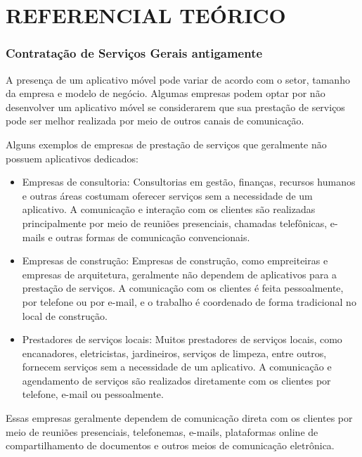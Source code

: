 \chapter{REFERENCIAL TEÓRICO}\label{cap:desenvolvimento}
\subsection{Contratação de Serviços Gerais antigamente}
A presença de um aplicativo móvel pode variar de acordo com o setor, tamanho da empresa e modelo de negócio. 
Algumas empresas podem optar por não desenvolver um aplicativo móvel se considerarem que sua prestação de serviços pode ser melhor realizada por meio de outros canais de comunicação.

Alguns exemplos de empresas de prestação de serviços que geralmente não possuem aplicativos dedicados:
\begin{itemize}[label=$\bullet$]
	\item Empresas de consultoria: Consultorias em gestão, finanças, recursos humanos e outras áreas costumam oferecer serviços sem a necessidade de um aplicativo. A comunicação e interação com os clientes são realizadas principalmente por meio de reuniões presenciais, chamadas telefônicas, e-mails e outras formas de comunicação convencionais.
	\item Empresas de construção: Empresas de construção, como empreiteiras e empresas de arquitetura, geralmente não dependem de aplicativos para a prestação de serviços. A comunicação com os clientes é feita pessoalmente, por telefone ou por e-mail, e o trabalho é coordenado de forma tradicional no local de construção.
	\item Prestadores de serviços locais: Muitos prestadores de serviços locais, como encanadores, eletricistas, jardineiros, serviços de limpeza, entre outros, fornecem serviços sem a necessidade de um aplicativo. A comunicação e agendamento de serviços são realizados diretamente com os clientes por telefone, e-mail ou pessoalmente.
\end{itemize}
Essas empresas geralmente dependem de comunicação direta com os clientes por meio de reuniões presenciais, telefonemas, e-mails, plataformas online de compartilhamento de documentos e outros meios de comunicação eletrônica.

